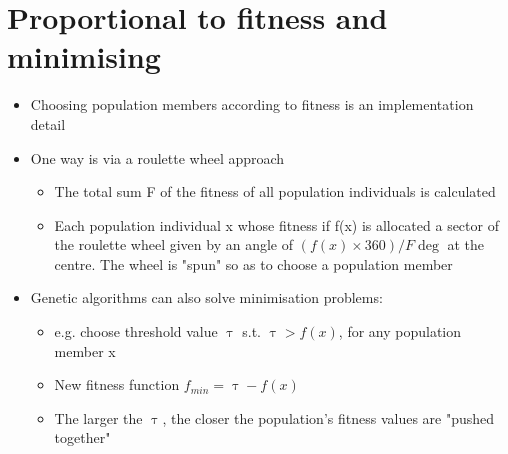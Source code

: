 \documentclass{article}[18pt]
\begin{document}
\section{Proportional to fitness and minimising}
\begin{itemize}
	\item Choosing population members according to fitness is an implementation detail
	\item One way is via a roulette wheel approach
	\begin{itemize}
		\item The total sum F of the fitness of all population individuals is calculated
		\item Each population individual x whose fitness if f(x) is allocated a sector of the roulette wheel given by an angle of $(f(x)\times 360)/ F \deg$ at the centre. The wheel is "spun" so as to choose a population member
	\end{itemize}
	\item Genetic algorithms can also solve minimisation problems:
	\begin{itemize}
		\item e.g. choose threshold value $\uptau$ s.t. $\uptau > f(x)$, for any population member x
		\item New fitness function $f_{min}=\uptau - f(x)$
		\item The larger the $\uptau$, the closer the population's fitness values are "pushed together"
	\end{itemize}
\end{itemize}
\end{document}
